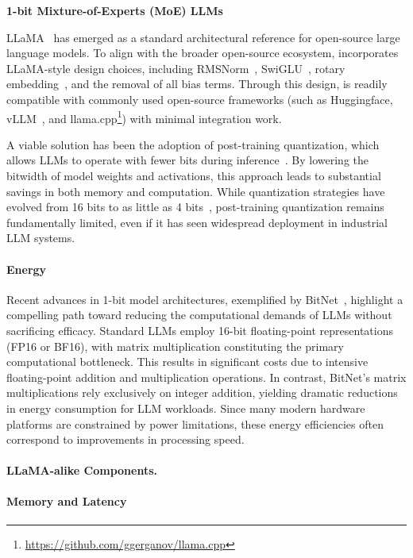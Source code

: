 \textbf{1-bit Mixture-of-Experts (MoE) LLMs}

LLaMA~\cite{llama, llama2} has emerged as a standard architectural reference for open-source large language models. To align with the broader open-source ecosystem,  incorporates LLaMA-style design choices, including RMSNorm~\cite{rmsnorm}, SwiGLU~\cite{swiglu}, rotary embedding~\cite{rope}, and the removal of all bias terms. Through this design,  is readily compatible with commonly used open-source frameworks (such as Huggingface, vLLM~\cite{vllm}, and llama.cpp\footnote{\url{https://github.com/ggerganov/llama.cpp}}) with minimal integration work.

A viable solution has been the adoption of post-training quantization, which allows LLMs to operate with fewer bits during inference~\cite{smoothquant, gptq, quip, quip_sharp}. By lowering the bitwidth of model weights and activations, this approach leads to substantial savings in both memory and computation. While quantization strategies have evolved from 16 bits to as little as 4 bits~\cite{gptq, awq}, post-training quantization remains fundamentally limited, even if it has seen widespread deployment in industrial LLM systems.

\paragraph{Energy}

Recent advances in 1-bit model architectures, exemplified by BitNet~\cite{bitnet}, highlight a compelling path toward reducing the computational demands of LLMs without sacrificing efficacy. Standard LLMs employ 16-bit floating-point representations (FP16 or BF16), with matrix multiplication constituting the primary computational bottleneck. This results in significant costs due to intensive floating-point addition and multiplication operations. In contrast, BitNet's matrix multiplications rely exclusively on integer addition, yielding dramatic reductions in energy consumption for LLM workloads. Since many modern hardware platforms are constrained by power limitations, these energy efficiencies often correspond to improvements in processing speed.

\paragraph{LLaMA-alike Components.}

\paragraph{Memory and Latency}

